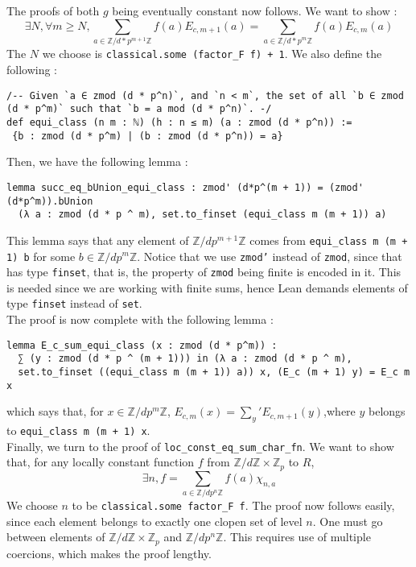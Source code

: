 \documentclass[a4paper,UKenglish,cleveref, autoref, thm-restate]{lipics-v2021}
\newcommand{\lean}[1]{\texttt{#1}\xspace} %
\begin{document}
The proofs of both $g$ being eventually constant now follows. We want to show : 
$$ \exists N, \forall m \ge N, \sum_{a \in \mathbb{Z}/d*p^{m + 1} \mathbb{Z}} f(a) E_{c,m + 1}(a) = \sum_{a \in \mathbb{Z}/d*p^{m} \mathbb{Z}} f(a) E_{c,m}(a) $$
The $N$ we choose is \lean{classical.some (factor\_F f) + 1}. We also define the following : 
\begin{lstlisting}
/-- Given `a ∈ zmod (d * p^n)`, and `n < m`, the set of all `b ∈ zmod (d * p^m)` such that `b = a mod (d * p^n)`. -/
def equi_class (n m : ℕ) (h : n ≤ m) (a : zmod (d * p^n)) :=
 {b : zmod (d * p^m) | (b : zmod (d * p^n)) = a}
\end{lstlisting}
Then, we have the following lemma :
\begin{lstlisting}
lemma succ_eq_bUnion_equi_class : zmod' (d*p^(m + 1)) = (zmod' (d*p^m)).bUnion
  (λ a : zmod (d * p ^ m), set.to_finset (equi_class m (m + 1)) a) 
\end{lstlisting}
This lemma says that any element of $\mathbb{Z}/dp^{m + 1} \mathbb{Z}$ comes from \lean{equi\_class m (m + 1) b} for some $b \in \mathbb{Z}/dp^m \mathbb{Z}$. 
Notice that we use \lean{zmod'} instead of \lean{zmod}, since that has type \lean{finset}, that is, the property of \lean{zmod} being finite is encoded in it. This 
is needed since we are working with finite sums, hence Lean demands elements of type \lean{finset} instead of \lean{set}. \\

The proof is now complete with the following lemma :
\begin{lstlisting}
lemma E_c_sum_equi_class (x : zmod (d * p^m)) :
  ∑ (y : zmod (d * p ^ (m + 1))) in (λ a : zmod (d * p ^ m), 
  set.to_finset ((equi_class m (m + 1)) a)) x, (E_c (m + 1) y) = E_c m x
\end{lstlisting}
which says that, for $x \in \mathbb{Z}/dp^m \mathbb{Z}$, $E_{c, m} (x) = \sum_{y}' E_{c, m + 1} (y)$,\newline where $y$ belongs to \lean{equi\_class m (m + 1) x}. \\

Finally, we turn to the proof of \lean{loc\_const\_eq\_sum\_char\_fn}. We want to show that, for any locally constant function $f$ from 
$\mathbb{Z}/d \mathbb{Z} \times \mathbb{Z}_p$ to $R$, 
$$\exists n, f = \sum_{a \in \mathbb{Z}/dp^n \mathbb{Z}} f(a) \chi_{n, a}$$
We choose $n$ to be \lean{classical.some factor\_F f}. The proof now follows easily, since each element belongs to exactly one clopen set of level $n$. One must go 
between elements of $\mathbb{Z}/d \mathbb{Z} \times \mathbb{Z}_p$ and $\mathbb{Z}/dp^n \mathbb{Z}$. This requires use of multiple coercions, which makes the proof lengthy. \\
\end{document}
